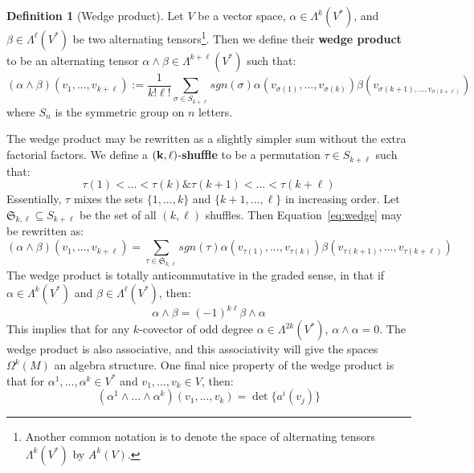 \documentclass[11pt, oneside]{article}   	%
\theoremstyle{definition}
\newtheorem{definition}{Definition}[section]
\begin{document}
\begin{definition}[Wedge product]
	Let $V$ be a vector space, $\alpha\in\Lambda^k(V^*)$, and $\beta\in\Lambda^\ell(V^*)$ be two alternating 
	tensors\footnote{Another common notation is to denote the space of alternating tensors $\Lambda^k(V^*)$ by $A^k(V)$.}. 
	Then we define their \textbf{wedge product} to be an alternating tensor $\alpha\wedge\beta\in\Lambda^{k + \ell}(V^*)$ 
	such that:
	\begin{equation}
		(\alpha\wedge\beta)(v_1, ..., v_{k + \ell}) := \frac{1}{k!\ell!}\sum_{\sigma\in S_{k + \ell}}sgn(\sigma)
		\alpha(v_{\sigma(1)}, ..., v_{\sigma(k)})\beta(v_{\sigma(k + 1), ..., v_{\sigma(k + \ell)}})~
		\label{eq:wedge}
	\end{equation}
	where $S_n$ is the symmetric group on $n$ letters. 
\end{definition}

The wedge product may be rewritten as a slightly simpler sum without the extra factorial factors. We define a 
$\bf{(k, \ell)}$-\textbf{shuffle} to be a permutation $\tau\in S_{k + \ell}$ such that:
\begin{equation}
	\tau(1) < ... < \tau(k) \& \tau(k + 1) < ... < \tau(k + \ell)
\end{equation}
Essentially, $\tau$ mixes the sets $\{1, ..., k\}$ and $\{k + 1, ..., \ell\}$ in increasing order. Let $\mathfrak S_{k, \ell}\subseteq
S_{k + \ell}$ be the set of all $(k, \ell)$ shuffles. Then Equation~\ref{eq:wedge} may be rewritten as:
\begin{equation}
	(\alpha\wedge\beta)(v_1, ..., v_{k + \ell}) = \sum_{\tau\in\mathfrak S_{k, \ell}}sgn(\tau)\alpha(v_{\tau(1)}, ..., v_{\tau(k)})
	\beta(v_{\tau(k + 1)}, ..., v_{\tau(k + \ell)})
\end{equation}
The wedge product is totally anticommutative in the graded sense, in that if $\alpha\in\Lambda^k(V^*)$ and $\beta\in
\Lambda^\ell(V^*)$, then:
\begin{equation}
	\alpha\wedge\beta = (-1)^{k\ell}\beta\wedge\alpha
\end{equation}
This implies that for any $k$-covector of odd degree $\alpha\in\Lambda^{2k}(V^*)$, $\alpha\wedge\alpha = 0$. The wedge 
product is also associative, and this associativity will give the spaces $\Omega^k(M)$ an algebra structure. One final nice 
property of the wedge product is that for $\alpha^1, ..., \alpha^k\in V^*$ and $v_1, ..., v_k\in V$, then:
\begin{equation}
	(\alpha^1\wedge ...\wedge\alpha^k)(v_1, ..., v_k) = \det\{a^i(v_j)\}
\end{equation}
\end{document}
